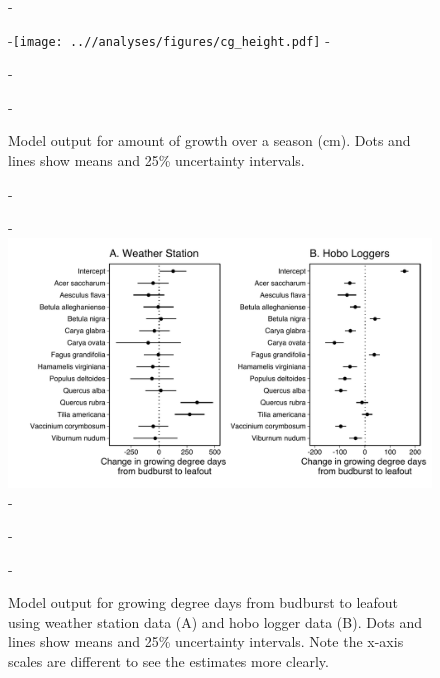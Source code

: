 \documentclass{article}\usepackage[]{graphicx}\usepackage[]{color}
\begin{document}
{{\begin{figure} [H]
  -\begin{center}
  -\texttt{[image: ..//analyses/figures/cg\_height.pdf]}
  -\caption{Model output for amount of growth over a season (cm). Dots and lines show means and 25\% uncertainty intervals.}\label{fig:cg}
  -\end{center}
  -\end{figure}}

{\begin{figure} [H]
  -\begin{center}
  -\includegraphics[width=16cm]{..//analyses/figures/muplot_compare_dvr.pdf}
  -\caption{Model output for growing degree days from budburst to leafout using weather station data (A) and hobo logger data (B). Dots and lines show means and 25\% uncertainty intervals. Note the x-axis scales are different to see the estimates more clearly.}\label{fig:dvr}
  -\end{center}
  -\end{figure}}
  
}
\end{document}
